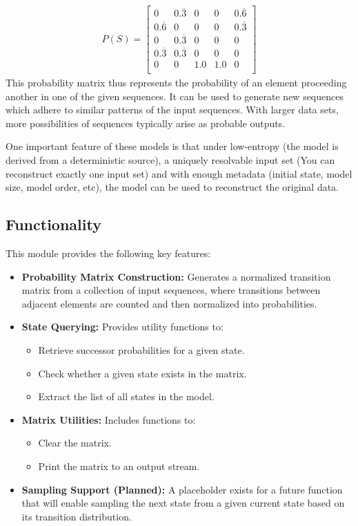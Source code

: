 \begin{align}
P(S) = \left[
\begin{matrix}
0 & 0.\overline{3} & 0 & 0 & 0.\overline{6} \\ 
0.\overline{6} & 0 & 0 & 0 & 0.\overline{3} \\ 
0 & 0.\overline{3} & 0 & 0 & 0 \\ 
0.\overline{3} & 0.\overline{3} & 0 & 0 & 0\\ 
0 & 0 & 1.0 & 1.0 & 0 \\ 
\end{matrix}\right]
\end{align}
This probability matrix thus represents the probability of an element proceeding another in one of the given sequences. It can be used to generate new sequences which adhere to similar patterns of the input sequences. With larger data sets, more possibilities of sequences typically arise as probable outputs. 

One important feature of these models is that under low-entropy (the model is derived from a deterministic source), a uniquely resolvable input set (You can reconstruct exactly one input set) and with enough metadata (initial state, model size, model order, etc), the model can be used to reconstruct the original data.


\subsection{Functionality}

This module provides the following key features:

\begin{itemize}
    \item \textbf{Probability Matrix Construction:} 
    Generates a normalized transition matrix from a collection of input sequences, where transitions between adjacent elements are counted and then normalized into probabilities.

    \item \textbf{State Querying:}
    Provides utility functions to:
    \begin{itemize}
        \item Retrieve successor probabilities for a given state.
        \item Check whether a given state exists in the matrix.
        \item Extract the list of all states in the model.
    \end{itemize}

    \item \textbf{Matrix Utilities:}
    Includes functions to:
    \begin{itemize}
        \item Clear the matrix.
        \item Print the matrix to an output stream.
    \end{itemize}

    \item \textbf{Sampling Support (Planned):}
    A placeholder exists for a future function that will enable sampling the next state from a given current state based on its transition distribution.
\end{itemize}

